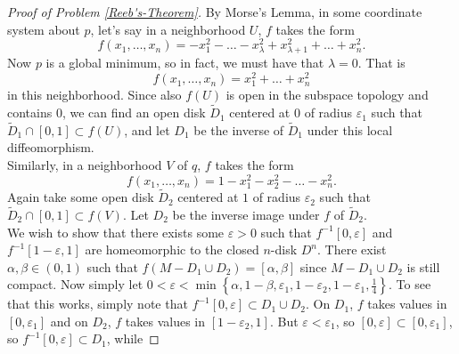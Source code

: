 \documentclass[reqno]{amsart}
\theoremstyle{definition}
\theoremstyle{remark}
\begin{document}
\begin{proof}[Proof of Problem \ref{Reeb's-Theorem}]
        By Morse's Lemma, in some coordinate system about
         $p$, let's say in a neighborhood $U$,
         $f$ takes the form
         \[
         f\left( x_1,\ldots,x_n \right) = 
         - x_1^2 - \ldots - x_{\lambda}^2 +
         x_{\lambda+1}^2 +\ldots + x_n^2.
         \] 
         Now $p$ is a global minimum, so in fact, we
         must have that $\lambda = 0$. That is
         \[
         f\left( x_1,\ldots,x_n \right) =
         x_{1}^2 + \ldots + x_n^2
         \] 
         in this neighborhood.
         Since also
         $f(U)$ is open in the subspace topology
         and contains $0$,
         we can find an open disk $\tilde{D}_1$ centered
         at $0$ of radius $\varepsilon_1$ such that
         $ \tilde{D}_1 \cap \left[ 0,1 \right] \subset 
         f(U)$, and
         let $D_1$ be the inverse of $\tilde{D}_1$ under this
         local diffeomorphism.\\
         Similarly, in a neighborhood $V$ of
         $q$, $f$ takes the form
         \[
         f\left( x_1,\ldots,x_n \right)  = 
         1- x_1^2 - x_2^2 - \ldots - x_n^2.
         \] 
         Again take some open disk $\tilde{D}_2$
         centered at $1$ of radius $\varepsilon_2$ 
         such that $ \tilde{D}_2 \cap
         \left[ 0,1 \right] \subset f(V)$.
         Let $D_2$ be the inverse image under $f$ of
         $\tilde{D}_2$.\\
         We wish to show that there
         exists some $\varepsilon > 0$ such that
         $f^{-1}\left[ 0,\varepsilon \right] $ 
         and $f^{-1}\left[ 1-\varepsilon,1 \right] $ are
         homeomorphic to the closed $n$-disk $D^{n}$.
         There
         exist
         $\alpha, \beta \in \left( 0,1 \right) $ such that
         $f\left( M - D_1 \cup D_2 \right) 
         = \left[ \alpha, \beta \right] $ since
         $M - D_1 \cup  D_2$ is still compact.
         Now simply let
         $0 < \varepsilon < \min 
         \left\{ \alpha, 1 - \beta, \varepsilon_1,
         1-\varepsilon_2, 1-\varepsilon_1, \frac{1}{4}\right\} $.
         To see that this works, simply note that
         $f^{-1}\left[ 0, \varepsilon \right] 
         \subset D_1 \cup  D_2$.
         On $D_1$, $f$ takes values in
         $\left[ 0, \varepsilon_1 \right] $ and
         on $D_2$, $f$ takes values in
         $\left[ 1- \varepsilon_2 , 1 \right] $.
         But $\varepsilon < \varepsilon_1$, so
         $\left[ 0, \varepsilon \right] \subset 
         \left[ 0, \varepsilon_1 \right] $, so
         $f^{-1}\left[ 0,\varepsilon \right] \subset 
         D_1$,
         while

\end{proof}
\end{document}
